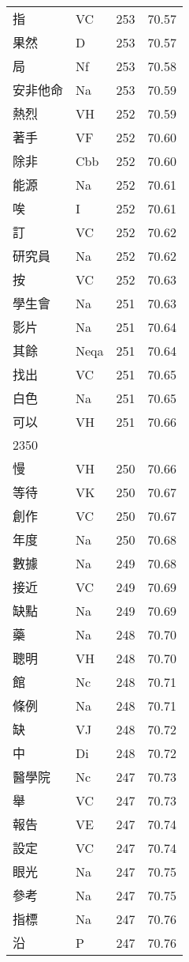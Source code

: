 \documentclass[twocolumn]{book}
\begin{document}
\begin{supertabular}{llrr}
指 & VC & 253 &  70.57\\
果然 & D & 253 &  70.57\\
局 & Nf & 253 &  70.58\\
安非他命 & Na & 253 &  70.59\\
熱烈 & VH & 252 &  70.59\\
著手 & VF & 252 &  70.60\\
除非 & Cbb & 252 &  70.60\\
能源 & Na & 252 &  70.61\\
唉 & I & 252 &  70.61\\
訂 & VC & 252 &  70.62\\
研究員 & Na & 252 &  70.62\\
按 & VC & 252 &  70.63\\
學生會 & Na & 251 &  70.63\\
影片 & Na & 251 &  70.64\\
其餘 & Neqa & 251 &  70.64\\
找出 & VC & 251 &  70.65\\
白色 & Na & 251 &  70.65\\
可以 & VH & 251 &  70.66\\
2350\\
慢 & VH & 250 &  70.66\\
等待 & VK & 250 &  70.67\\
創作 & VC & 250 &  70.67\\
年度 & Na & 250 &  70.68\\
數據 & Na & 249 &  70.68\\
接近 & VC & 249 &  70.69\\
缺點 & Na & 249 &  70.69\\
藥 & Na & 248 &  70.70\\
聰明 & VH & 248 &  70.70\\
館 & Nc & 248 &  70.71\\
條例 & Na & 248 &  70.71\\
缺 & VJ & 248 &  70.72\\
中 & Di & 248 &  70.72\\
醫學院 & Nc & 247 &  70.73\\
舉 & VC & 247 &  70.73\\
報告 & VE & 247 &  70.74\\
設定 & VC & 247 &  70.74\\
眼光 & Na & 247 &  70.75\\
參考 & Na & 247 &  70.75\\
指標 & Na & 247 &  70.76\\
沿 & P & 247 &  70.76\\

\end{supertabular}
\end{document}
